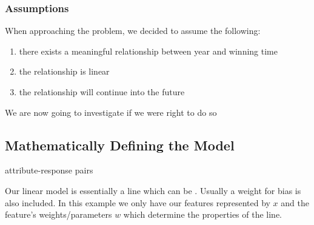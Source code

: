 		\subsubsection{Assumptions}

		\par{When approaching the problem, we decided to assume the following:}

			\begin{enumerate}
				\item there exists a meaningful relationship between year and winning time
				\item the relationship is linear
				\item the relationship will continue into the future
			\end{enumerate}

		\par{We are now going to investigate if we were right to do so}



	\subsection{Mathematically Defining the Model}









		attribute-response pairs



		\par{Our linear model is essentially a line which can be . Usually a weight for bias is also included. In this example we only have our features represented by $x$ and the feature's weights/parameters $w$ which determine the properties of the line.}

